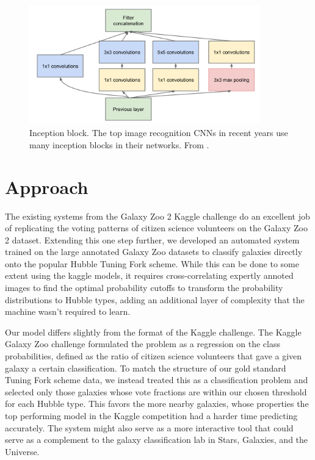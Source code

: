 \documentclass{article}
\begin{document}
\fi

\begin{figure}[h]
  \centering
	\includegraphics[width=100mm]{../img/inception.png}
  \caption{Inception block. The top image recognition CNNs in recent years use many inception blocks in their networks. From \cite{2014arXiv1409.4842S}.}
  \label{fig:inception}
\end{figure}

\section{Approach}
The existing systems from the Galaxy Zoo 2 Kaggle challenge do an excellent job of replicating the voting patterns of citizen science volunteers on the Galaxy Zoo 2 dataset. Extending this one step further, we developed an automated system trained on the large annotated Galaxy Zoo datasets to classify galaxies directly onto the popular Hubble Tuning Fork scheme. While this can be done to some extent using the kaggle models, it requires cross-correlating expertly annoted images to find the optimal probability cutoffs to transform the probability distributions to Hubble types, adding an additional layer of complexity that the machine wasn’t required to learn.

Our model differs slightly from the format of the Kaggle challenge. The Kaggle Galaxy Zoo challenge formulated the problem as a regression on the class probabilities, defined as the ratio of citizen science volunteers that gave a given galaxy a certain classification. To match the structure of our gold standard Tuning Fork scheme data, we instead treated this as a classification problem and selected only those galaxies whose vote fractions are within our chosen threshold for each Hubble type. This favors the more nearby galaxies, whose properties the top performing model in the Kaggle competition had a harder time predicting accurately. The system might also serve as a more interactive tool that could serve as a complement to the galaxy classification lab in Stars, Galaxies, and the Universe.
\end{document}
